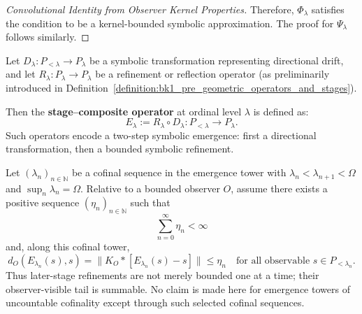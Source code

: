 \begin{proposition}
\begin{proof}[Convolutional Identity from Observer Kernel Properties]
Therefore, $\Phi_\lambda$ satisfies the condition to be a kernel-bounded symbolic approximation. The proof for $\Psi_\lambda$ follows similarly.
\end{proof}
\end{proposition}
\begin{definition}
\label{definition:bk1_stage_composite_operator}
Let \(D_\lambda : P_{<\lambda} \to P_\lambda\) be a symbolic transformation representing directional drift, and let \(R_\lambda : P_\lambda \to P_\lambda\) be a refinement or reflection operator  
(as preliminarily introduced in Definition~\ref{definition:bk1_pre_geometric_operators_and_stages}).

Then the \textbf{stage--composite operator} at ordinal level \(\lambda\) is defined as:
\[
E_\lambda := R_\lambda \circ D_\lambda : P_{<\lambda} \to P_\lambda.
\]
Such operators encode a two-step symbolic emergence: first a directional transformation, then a bounded symbolic refinement.
\end{definition}

\begin{axiom}
\label{axiom:bk1_summable_resolution_decay}
Let \((\lambda_n)_{n\in\mathbb{N}}\) be a cofinal sequence in the emergence
tower with \(\lambda_n<\lambda_{n+1}<\Omega\) and
\(\sup_n\lambda_n=\Omega\). Relative to a bounded observer \(O\), assume there
exists a positive sequence \((\eta_n)_{n\in\mathbb{N}}\) such that
\[
\sum_{n=0}^{\infty}\eta_n < \infty
\]
and, along this cofinal tower,
\[
d_O(E_{\lambda_n}(s),s)
= \lVert K_O * [E_{\lambda_n}(s)-s]\rVert
\leq \eta_n
\quad\text{for all observable }s\in P_{<\lambda_n}.
\]
Thus later-stage refinements are not merely bounded one at a time; their
observer-visible tail is summable. No claim is made here for emergence towers
of uncountable cofinality except through such selected cofinal sequences.
\end{axiom}

